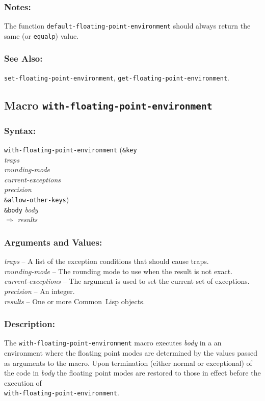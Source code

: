 \documentclass[10pt,fleqn]{article}
\newcommand{\CL}{\textsf{Common~Lisp}}
\newcommand{\code}[1]{\texttt{#1}}
\newcommand{\varname}[1]{\textit{#1}}
\newcommand{\DDictionaryItem}[1]{\vspace*{6pt}\noindent\hrulefill\vspace*{-9pt}\subsection*{#1}}
\newcommand{\DSyntax}{\subsubsection*{Syntax:}}
\newcommand{\DArgsNValues}{\subsubsection*{Arguments and Values:}}
\newcommand{\DDescription}{\subsubsection*{Description:}}
\newcommand{\DNotes}{\subsubsection*{Notes:}}
\newcommand{\DSeeAlso}{\subsubsection*{See Also:}}
\begin{document}
\DNotes{}

The function \code{default-floating-point-environment} should always return
the same (or \code{equalp}) value.

\DSeeAlso{}

\code{set-floating-point-environment}, \code{get-floating-point-environment}.


\newpage
\DDictionaryItem{Macro \code{with-floating-point-environment}}

\DSyntax{}


\begin{tabbing}
\code{with-floating-point-environment} \=(\=\code{\&key}\\
\>\>                                \varname{traps}\\
\>\>                                \varname{rounding-mode}\\
\>\>                                \varname{current-exceptions}\\
\>\>                                \varname{precision}\\
\>\>                                \code{\&allow-other-keys})\\
\> \code{\&body} \varname{body}\\
$\Rightarrow$ \varname{results}
\end{tabbing}




\DArgsNValues{}

\varname{traps} -- A list of the exception conditions that should cause
traps.\\
\varname{rounding-mode} -- The rounding mode to use when the result is
not exact.\\
\varname{current-exceptions} -- The argument is used to set the current
set of exceptions.\\
\varname{precision} -- An integer.\\
\varname{results} -- One or more \CL{} objects.


\DDescription{}

The \code{with-floating-point-environment} macro executes \varname{body} in a
an environment where the floating point modes are determined by the
values passed as arguments to the macro.  Upon termination (either
normal or exceptional) of the code in \varname{body} the floating
point modes are restored to those in effect before the execution of\\
\code{with-floating-point-environment}.
\end{document}
